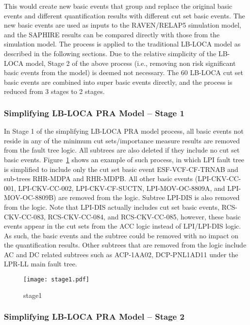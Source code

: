 This would create new basic events that group and replace the original basic events and different quantification results with different cut set basic events. The new basic events are used as inputs to the RAVEN/RELAP5 simulation model, and the SAPHIRE results can be compared directly with those from the simulation model. 
The process is applied to the traditional LB-LOCA model as described in the following sections. Due to the relative simplicity of the LB-LOCA model, Stage 2 of the above process (i.e., removing non risk significant basic events from the model) is deemed not necessary. The 60 LB-LOCA cut set basic events are combined into super basic events directly, and the process is reduced from 3 stages to 2 stages.

\subsubsection{Simplifying LB-LOCA PRA Model – Stage 1}

In Stage 1 of the simplifying LB-LOCA PRA model process, all basic events not reside in any of the minimum cut sets/importance measure results are removed from the fault tree logic. All subtrees are also deleted if they include no cut set basic events. 
Figure~\ref{fig:stage1} shows an example of such process, in which LPI fault tree is simplified to include only the cut set basic event ESF-VCF-CF-TRNAB and sub-trees RHR-MDPA and RHR-MDPB. All other basic events (LPI-CKV-CC-001, LPI-CKV-CC-002, LPI-CKV-CF-SUCTN, LPI-MOV-OC-8809A, and LPI-MOV-OC-8809B) are removed from the logic. Subtree LPI-DIS is also removed from the logic. Note that LPI-DIS actually includes cut set basic events, RCS-CKV-CC-083, RCS-CKV-CC-084, and RCS-CKV-CC-085, however, these basic events appear in the cut sets from the ACC logic instead of LPI/LPI-DIS logic. As such, the basic events and the subtree could be removed with no impact on the quantification results. Other subtrees that are removed from the logic include AC and DC related subtrees such as ACP-1AA02, DCP-PNL1AD11 under the LPR-LL main fault tree.

\begin{figure}
    \centering
    \texttt{[image: stage1.pdf]}
    \caption{stage1}
    \label{fig:stage1}
\end{figure} 

\subsubsection{Simplifying LB-LOCA PRA Model – Stage 2}

